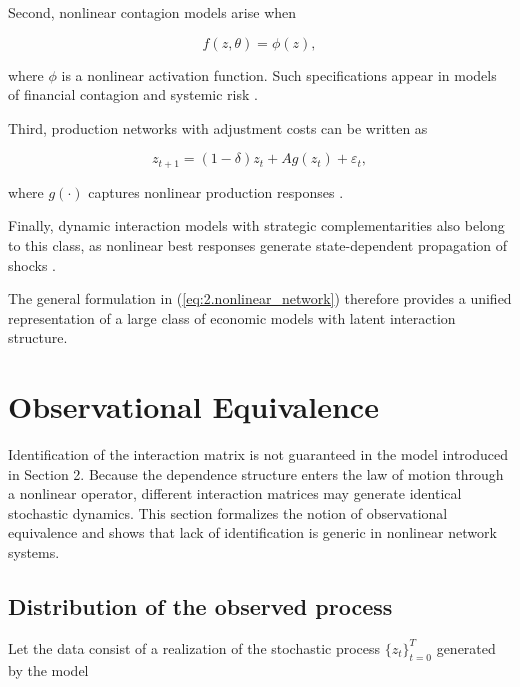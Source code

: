 \documentclass[12pt]{article}
\numberwithin{equation}{section}
\begin{document}
Second, nonlinear contagion models arise when

\begin{equation}
f(z,\theta)
=
\phi(z),
\label{eq:2.contagion}
\end{equation}

where $\phi$ is a nonlinear activation function. Such specifications appear in
models of financial contagion and systemic risk
\citep{elliott2014financial, acemoglu2015systemic}.

Third, production networks with adjustment costs can be written as

\begin{equation}
z_{t+1}
=
(1-\delta) z_t
+
A g(z_t)
+
\varepsilon_t,
\label{eq:2.production}
\end{equation}

where $g(\cdot)$ captures nonlinear production responses
\citep{acemoglu2012network}.

Finally, dynamic interaction models with strategic complementarities also
belong to this class, as nonlinear best responses generate state-dependent
propagation of shocks
\citep{cooper1998coordination, morris1998coordination}.

The general formulation in (\ref{eq:2.nonlinear_network}) therefore provides a
unified representation of a large class of economic models with latent
interaction structure.

\section{Observational Equivalence}

Identification of the interaction matrix is not guaranteed in the model
introduced in Section 2. Because the dependence structure enters the law of
motion through a nonlinear operator, different interaction matrices may
generate identical stochastic dynamics. This section formalizes the notion of
observational equivalence and shows that lack of identification is generic in
nonlinear network systems.

\subsection{Distribution of the observed process}

Let the data consist of a realization of the stochastic process
$\{z_t\}_{t=0}^T$ generated by the model
\end{document}
